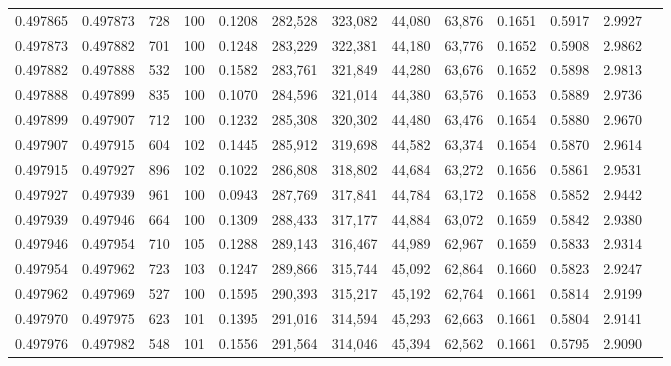 \begin{tabular}{rrrrrrrrrrrrr}
0.497865 & 0.497873 &   728 & 100 &                                     0.1208 & 282,528 & 323,082 &  44,080 &  63,876 & 0.1651 & 0.5917 & 2.9927 \\
0.497873 & 0.497882 &   701 & 100 &                                     0.1248 & 283,229 & 322,381 &  44,180 &  63,776 & 0.1652 & 0.5908 & 2.9862 \\
0.497882 & 0.497888 &   532 & 100 &                                     0.1582 & 283,761 & 321,849 &  44,280 &  63,676 & 0.1652 & 0.5898 & 2.9813 \\
0.497888 & 0.497899 &   835 & 100 &                                     0.1070 & 284,596 & 321,014 &  44,380 &  63,576 & 0.1653 & 0.5889 & 2.9736 \\
0.497899 & 0.497907 &   712 & 100 &                                     0.1232 & 285,308 & 320,302 &  44,480 &  63,476 & 0.1654 & 0.5880 & 2.9670 \\
0.497907 & 0.497915 &   604 & 102 &                                     0.1445 & 285,912 & 319,698 &  44,582 &  63,374 & 0.1654 & 0.5870 & 2.9614 \\
0.497915 & 0.497927 &   896 & 102 &                                     0.1022 & 286,808 & 318,802 &  44,684 &  63,272 & 0.1656 & 0.5861 & 2.9531 \\
0.497927 & 0.497939 &   961 & 100 &                                     0.0943 & 287,769 & 317,841 &  44,784 &  63,172 & 0.1658 & 0.5852 & 2.9442 \\
0.497939 & 0.497946 &   664 & 100 &                                     0.1309 & 288,433 & 317,177 &  44,884 &  63,072 & 0.1659 & 0.5842 & 2.9380 \\
0.497946 & 0.497954 &   710 & 105 &                                     0.1288 & 289,143 & 316,467 &  44,989 &  62,967 & 0.1659 & 0.5833 & 2.9314 \\
0.497954 & 0.497962 &   723 & 103 &                                     0.1247 & 289,866 & 315,744 &  45,092 &  62,864 & 0.1660 & 0.5823 & 2.9247 \\
0.497962 & 0.497969 &   527 & 100 &                                     0.1595 & 290,393 & 315,217 &  45,192 &  62,764 & 0.1661 & 0.5814 & 2.9199 \\
0.497970 & 0.497975 &   623 & 101 &                                     0.1395 & 291,016 & 314,594 &  45,293 &  62,663 & 0.1661 & 0.5804 & 2.9141 \\
0.497976 & 0.497982 &   548 & 101 &                                     0.1556 & 291,564 & 314,046 &  45,394 &  62,562 & 0.1661 & 0.5795 & 2.9090 \\

\end{tabular}
